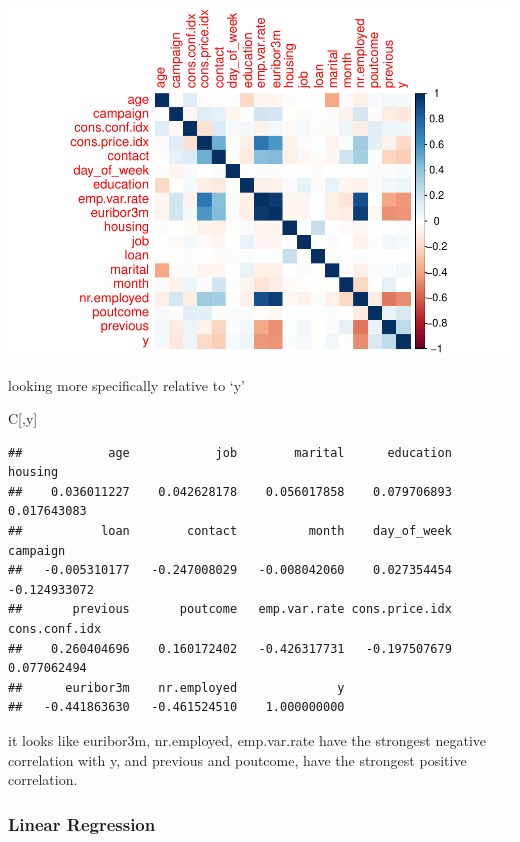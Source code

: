 \documentclass[
]{article}
\newenvironment{Shaded}{\begin{snugshade}}{\end{snugshade}}
\newcommand{\NormalTok}[1]{#1}
\newcommand{\StringTok}[1]{\textcolor[rgb]{0.31,0.60,0.02}{#1}}
\begin{document}
\includegraphics{part1_files/figure-latex/unnamed-chunk-17-1.pdf}

looking more specifically relative to `y'

\begin{Shaded}
\begin{Highlighting}[]
\NormalTok{C[,}\StringTok{\textquotesingle{}y\textquotesingle{}}\NormalTok{]}
\end{Highlighting}
\end{Shaded}

\begin{verbatim}
##            age            job        marital      education        housing 
##    0.036011227    0.042628178    0.056017858    0.079706893    0.017643083 
##           loan        contact          month    day_of_week       campaign 
##   -0.005310177   -0.247008029   -0.008042060    0.027354454   -0.124933072 
##       previous       poutcome   emp.var.rate cons.price.idx  cons.conf.idx 
##    0.260404696    0.160172402   -0.426317731   -0.197507679    0.077062494 
##      euribor3m    nr.employed              y 
##   -0.441863630   -0.461524510    1.000000000
\end{verbatim}

it looks like euribor3m, nr.employed, emp.var.rate have the strongest
negative correlation with y, and previous and poutcome, have the
strongest positive correlation.

\hypertarget{linear-regression}{%
\subsubsection{Linear Regression}\label{linear-regression}}
\end{document}

